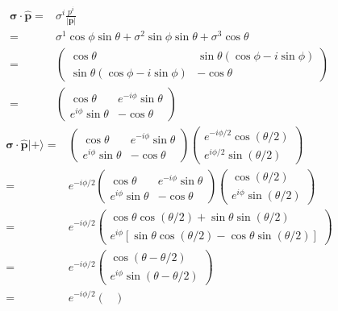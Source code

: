 \begin{subappendices}
\begin{align}
  \boldsymbol{\sigma}\cdot\hat{\mathbf{p}}=&\sigma^i \frac{p^i}{|\mathbf{p}|}\nonumber\\
  =&\sigma^1\cos\phi\sin\theta+\sigma^2\sin\phi\sin\theta+\sigma^3\cos\theta\nonumber\\
  =&\begin{pmatrix}
    \cos\theta&\sin\theta(\cos\phi-i\sin\phi)\\
    \sin\theta(\cos\phi-i\sin\phi)&-\cos\theta
  \end{pmatrix}\nonumber\\
  =&\begin{pmatrix}
    \cos\theta&e^{-i\phi}\sin\theta\\
    e^{i\phi}\sin\theta&-\cos\theta
  \end{pmatrix}
\end{align}
\begin{align}
\boldsymbol{\sigma}\cdot\hat{\mathbf{p}}|+\rangle=&\begin{pmatrix}
    \cos\theta&e^{-i\phi}\sin\theta\\
    e^{i\phi}\sin\theta&-\cos\theta
  \end{pmatrix}\begin{pmatrix}
  e^{-i \phi/2}\cos(\theta/2)\\
  e^{i \phi/2}\sin(\theta/2)
  \end{pmatrix}\nonumber\\
  =&e^{-i\phi/2}\begin{pmatrix}
    \cos\theta&e^{-i\phi}\sin\theta\\
    e^{i\phi}\sin\theta&-\cos\theta
  \end{pmatrix}\begin{pmatrix}
  \cos(\theta/2)\\
  e^{i \phi}\sin(\theta/2)
  \end{pmatrix}\nonumber\\
  =&e^{-i\phi/2}
  \begin{pmatrix}
    \cos\theta\cos(\theta/2)+\sin\theta\sin(\theta/2)\\
    e^{i\phi}[\sin\theta\cos(\theta/2)- \cos\theta\sin(\theta/2)]
  \end{pmatrix}\nonumber\\
  =&e^{-i\phi/2}
  \begin{pmatrix}
    \cos(\theta-\theta/2)\\
    e^{i\phi}\sin(\theta-\theta/2)
  \end{pmatrix}\nonumber\\
  =&e^{-i\phi/2}
  \begin{pmatrix}

\end{pmatrix}
\end{align}
\end{subappendices}
